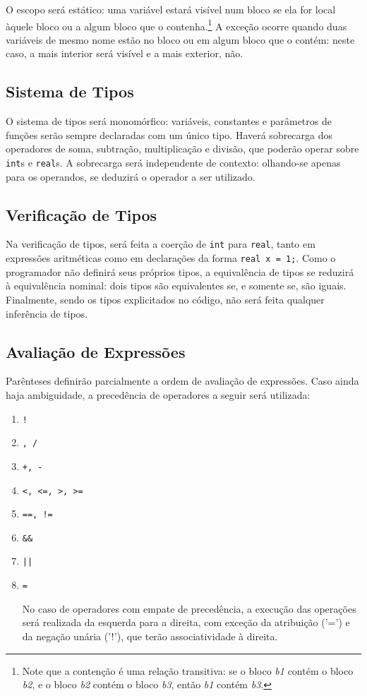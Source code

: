 \documentclass[12pt]{article}
\begin{document}
O escopo será estático: uma variável estará visível num bloco se ela for local àquele bloco ou a algum bloco que o contenha.\footnote{Note que a contenção é uma relação transitiva: se o bloco {\it b1} contém o bloco {\it b2}, e o bloco {\it b2} contém o bloco {\it b3}, então {\it b1} contém {\it b3}.} A exceção ocorre quando duas variáveis de mesmo nome estão no bloco ou em algum bloco que o contém: neste caso, a mais interior será visível e a mais exterior, não.

\subsection{Sistema de Tipos}
O sistema de tipos será monomórfico: variáveis, constantes e parâmetros de funções serão sempre declaradas com um único tipo. Haverá sobrecarga dos operadores de soma, subtração, multiplicação e divisão,  que poderão operar sobre {\tt int}s e {\tt real}s. A sobrecarga será independente de contexto: olhando-se apenas para os operandos, se deduzirá o operador a ser utilizado.


\subsection{Verificação de Tipos}
Na verificação de tipos, será feita a coerção de {\tt int} para {\tt real}, tanto em expressões aritméticas como em declarações da forma {\tt real x = 1;}. Como o programador não definirá seus próprios tipos, a equivalência de tipos se reduzirá à equivalência nominal: dois tipos são equivalentes se, e somente se, são iguais. Finalmente, sendo os tipos explicitados no código, não será feita qualquer inferência de tipos.

\subsection{Avaliação de Expressões}
Parênteses definirão parcialmente a ordem de avaliação de expressões. Caso ainda haja ambiguidade, a precedência de operadores a seguir será utilizada:

\begin{enumerate}
\item {\tt !}
\item {\tt *, /}
\item {\tt +, -}
\item {\tt <, <=, >, >=}
\item {\tt ==, !=}
\item {\tt \&\&}
\item {\tt ||}
\item {\tt =}

No caso de operadores com empate de precedência, a execução das operações será realizada da esquerda para a direita, com exceção da atribuição ('=') e da negação unária ('!'), que terão associatividade à direita.

\end{enumerate}
\end{document}
